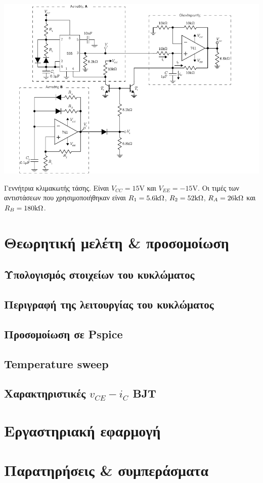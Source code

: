 \begin{center}
	\begin{circuitfig}[H]
		\centering
		\includegraphics[width=14cm]{circuits/micro3_lab2.pdf}
		\caption{Γεννήτρια κλιμακωτής τάσης. Είναι $V_{CC}=15\unit{\volt}$ και $V_{EE}=-15\unit{\volt}$. Οι τιμές των αντιστάσεων που χρησιμοποιήθηκαν είναι $R_1=5.6\kohm$, $R_2=52\kohm$, $R_A=26\kohm$ και $R_B=180\kohm$.}
		\label{circ:2_schematic}
	\end{circuitfig}
\end{center}

\section{Θεωρητική μελέτη \& προσομοίωση}

	\subsection{Υπολογισμός στοιχείων του κυκλώματος}
		

	\subsection{Περιγραφή της λειτουργίας του κυκλώματος}
		

	\subsection{Προσομοίωση σε Pspice}
		

	\subsection{Temperature sweep}
		

	\subsection{Χαρακτηριστικές $v_{CE}-i_C$ BJT}
		

\newpage
\section{Εργαστηριακή εφαρμογή}
	

\newpage
\section{Παρατηρήσεις \& συμπεράσματα}
	